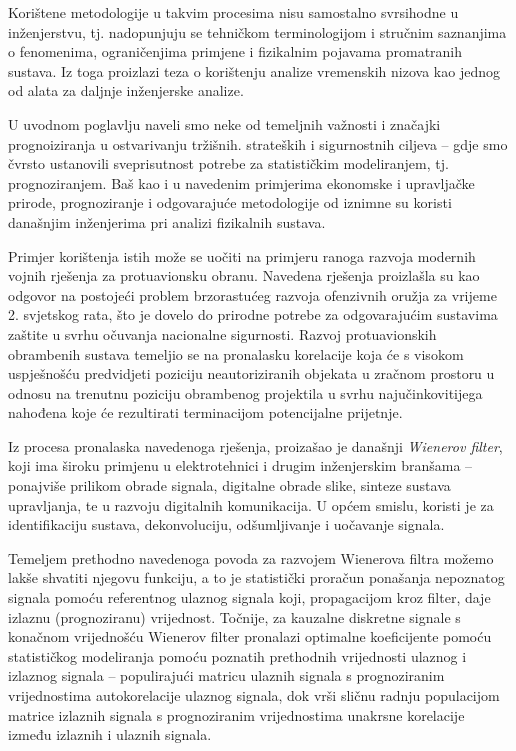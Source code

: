 \documentclass[a4paper,12pt,oneside]{memoir}
\begin{document}
            Korištene metodologije u takvim procesima nisu samostalno svrsihodne u inženjerstvu, tj. nadopunjuju se tehničkom terminologijom i stručnim saznanjima o fenomenima, ograničenjima primjene i fizikalnim pojavama promatranih sustava. Iz toga proizlazi teza o korištenju analize vremenskih nizova kao jednog od alata za daljnje inženjerske analize.


            U uvodnom poglavlju naveli smo neke od temeljnih važnosti i značajki prognoiziranja u ostvarivanju tržišnih. strateških i sigurnostnih ciljeva -- gdje smo čvrsto ustanovili sveprisutnost potrebe za statističkim modeliranjem, tj. prognoziranjem. Baš kao i u navedenim primjerima ekonomske i upravljačke prirode, prognoziranje i odgovarajuće metodologije od iznimne su koristi današnjim inženjerima pri analizi fizikalnih sustava. 
            
            Primjer korištenja istih može se uočiti na primjeru ranoga razvoja modernih vojnih rješenja za protuavionsku obranu. Navedena rješenja proizlašla su kao odgovor na postojeći problem brzorastućeg razvoja ofenzivnih oružja za vrijeme 2. svjetskog rata, što je dovelo do prirodne potrebe za odgovarajućim sustavima zaštite u svrhu očuvanja nacionalne  sigurnosti. Razvoj protuavionskih obrambenih sustava temeljio se na pronalasku korelacije koja će s visokom uspješnošću predvidjeti poziciju neautoriziranih objekata u zračnom prostoru u odnosu na trenutnu poziciju obrambenog projektila u svrhu najučinkovitijega nahođena koje će rezultirati terminacijom potencijalne prijetnje.
            
            Iz procesa pronalaska navedenoga rješenja, proizašao je današnji \textit{Wienerov filter}, koji ima široku primjenu u elektrotehnici i drugim inženjerskim branšama -- ponajviše prilikom obrade signala, digitalne obrade slike, sinteze sustava upravljanja, te u razvoju digitalnih komunikacija. U općem smislu, koristi je za identifikaciju sustava, dekonvoluciju, odšumljivanje i uočavanje signala.

            Temeljem prethodno navedenoga povoda za razvojem Wienerova filtra možemo lakše shvatiti njegovu funkciju, a to je statistički proračun ponašanja nepoznatog signala pomoću referentnog ulaznog signala koji, propagacijom kroz filter, daje izlaznu (prognoziranu) vrijednost. Točnije, za kauzalne diskretne signale s konačnom vrijednošću Wienerov filter pronalazi optimalne koeficijente pomoću statističkog modeliranja pomoću poznatih prethodnih vrijednosti ulaznog i izlaznog signala -- populirajući matricu ulaznih signala s prognoziranim vrijednostima autokorelacije ulaznog signala, dok vrši sličnu radnju populacijom matrice izlaznih signala s prognoziranim vrijednostima unakrsne korelacije između izlaznih i ulaznih signala.
\end{document}
